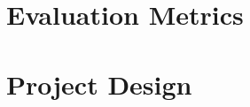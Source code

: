 \documentclass[a4paper]{article}
\begin{document}
\section{Evaluation Metrics}


\section{Project Design}

\vspace*{1cm}


\end{document}
